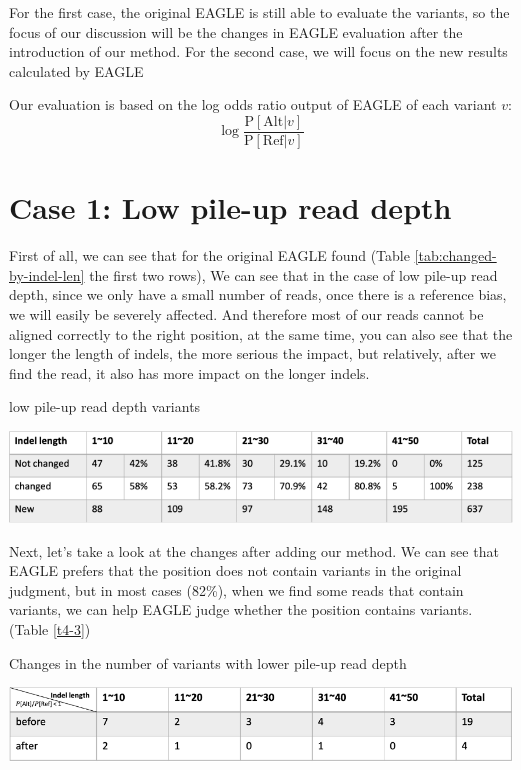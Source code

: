 For the first case, the original EAGLE is still able to evaluate the variants, so the focus of our discussion will be the changes in EAGLE evaluation after the introduction of our method. For the second case, we will focus on the new results calculated by EAGLE

\begin{samepage}
\noindent
Our evaluation is based on the log odds ratio output of EAGLE of each variant $v$:
\begin{equation*}
\log \frac{\text{P}[\text{Alt} | v]}{\text{P}[\text{Ref} | v]}
\end{equation*}
\end{samepage}


\section{Case 1: Low pile-up read depth}
First of all, we can see that for the original EAGLE found (Table \ref{tab:changed-by-indel-len} the first two rows), We can see that in the case of low pile-up read depth, since we only have a small number of reads, once there is a reference bias, we will easily be severely affected. And therefore most of our reads cannot be aligned correctly to the right position, at the same time, you can also see that the longer the length of indels, the more serious the impact, but relatively, after we find the read, it also has more impact on the longer indels.

\begin{table}[ht]
\caption[low pile-up read depth variants]{low pile-up read depth variants}
\includegraphics[width=1\textwidth]{body/image/tab:changed-by-indel-len.png}
\label{tab:changed-by-indel-len}
\end{table}

Next, let’s take a look at the changes after adding our method. We can see that EAGLE prefers that the position does not contain variants in the original judgment, but in most cases (82\%), when we find some reads that contain variants, we can help EAGLE judge whether the position contains variants. (Table \ref{t4-3})

\begin{table}[h]
\caption[Changes in the number of variants with lower pile-up read depth]{Changes in the number of variants with lower pile-up read depth}
\includegraphics[width=1\textwidth]{body/image/t4-3.png}
\label{t4-3}
\end{table}

